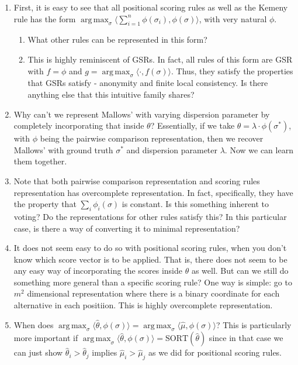 \documentclass[10pt,letterpaper]{article}
\newcommand{\sort}{\text{SORT}}
\newcommand{\muhat}{\hat{\mu}}
\newcommand{\that}{\hat{\theta}}
\DeclareMathOperator*{\argmax}{arg\,max}
\begin{document}
\begin{enumerate}
\item First, it is easy to see that all positional scoring rules as well as the Kemeny rule has the form $\argmax_{\sigma} \langle \sum_{i=1}^n \phi(\sigma_i), \phi(\sigma) \rangle$, with very natural $\phi$. 
\begin{enumerate}
\item What other rules can be represented in this form?
\item This is highly reminiscent of GSRs. In fact, all rules of this form are GSR with $f = \phi$ and $g = \argmax_{\sigma} \langle \cdot , f(\sigma) \rangle$. Thus, they satisfy the properties that GSRs satisfy - anonymity and finite local consistency. Is there anything else that this intuitive family shares?
\end{enumerate}

\item Why can't we represent Mallows' with varying dispersion parameter by completely incorporating that inside $\theta$? Essentially, if we take $\theta = \lambda \cdot \phi(\sigma^*)$, with $\phi$ being the pairwise comparison representation, then we recover Mallows' with ground truth $\sigma^*$ and dispersion parameter $\lambda$. Now we can learn them together.

\item Note that both pairwise comparison representation and scoring rules representation has overcomplete representation. In fact, specifically, they have the property that $\sum_i \phi_i(\sigma)$ is constant. Is this something inherent to voting? Do the representations for other rules satisfy this? In this particular case, is there a way of converting it to minimal representation?

\item It does not seem easy to do so with positional scoring rules, when you don't know which score vector is to be applied. That is, there does not seem to be any easy way of incorporating the scores inside $\theta$ as well. But can we still do something more general than a specific scoring rule? One way is simple: go to $m^2$ dimensional representation where there is a binary coordinate for each alternative in each positiion. This is highly overcomplete representation.

\item When does $\argmax_{\sigma} \langle \that, \phi(\sigma) \rangle = \argmax_{\sigma} \langle \muhat, \phi(\sigma) \rangle$? This is particularly more important if $\argmax_{\sigma} \langle \that, \phi(\sigma) \rangle = \sort(\that)$ since in that case we can just show $\that_i > \that_j$ implies $\muhat_i > \muhat_j$ as we did for positional scoring rules.
\end{enumerate}
\end{document}
